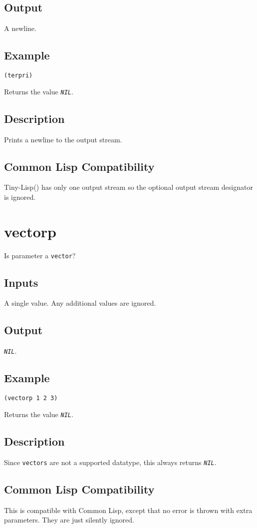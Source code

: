 \documentclass[10pt, openany]{book}
\newcommand{\constant}[1]{\emph{\texttt{#1}}}
\newcommand{\datatype}[1]{\texttt{#1}}
\newcommand{\tl}{Tiny-Lisp}
\newcommand{\cl}{Common Lisp}
\begin{document}
\subsection{Output}
A newline.
\subsection{Example}
\begin{lstlisting}
(terpri)
\end{lstlisting}
Returns the value \constant{NIL}.
\subsection{Description}
Prints a newline to the output stream.
\subsection{Common Lisp Compatibility}
\tl() has only one output stream so the optional output stream designator is ignored.

\section{vectorp}
Is parameter a \datatype{vector}?
\subsection{Inputs}
A single value.  Any additional values are ignored.
\subsection{Output}
\constant{NIL}.
\subsection{Example}
\begin{lstlisting}
(vectorp 1 2 3)
\end{lstlisting}
Returns the value \constant{NIL}.
\subsection{Description}
Since \datatype{vectors} are not a supported datatype, this always returns \constant{NIL}.
\subsection{Common Lisp Compatibility}
This is compatible with \cl, except that no error is thrown with extra parameters.  They are just silently ignored.
\end{document}
